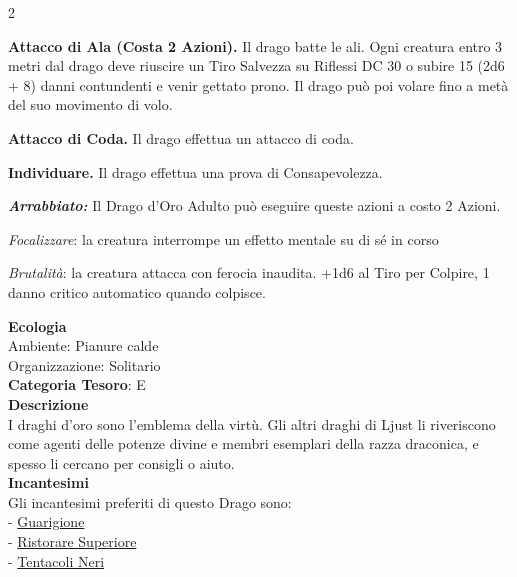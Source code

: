 \begin{multicols}{2}
{\textbf{Attacco di Ala (Costa 2 Azioni).} Il drago batte le ali. Ogni creatura entro 3 metri dal drago deve riuscire un Tiro Salvezza su Riflessi DC 30 o subire 15 (2d6 + 8) danni contundenti e venir gettato prono. Il drago può poi volare fino a metà del suo movimento di volo.

\textbf{Attacco di Coda.} Il drago effettua un attacco di coda.

\textbf{Individuare.} Il drago effettua una prova di Consapevolezza.

\emph{\textbf{Arrabbiato:}} Il Drago d'Oro Adulto può eseguire queste azioni a costo 2 Azioni.

\emph{Focalizzare}: la creatura interrompe un effetto mentale su di sé in corso

\emph{Brutalità}: la creatura attacca con ferocia inaudita. +1d6 al Tiro per Colpire, 1 danno critico automatico quando colpisce.

\textbf{Ecologia}\\
Ambiente: Pianure calde\\
Organizzazione: Solitario\\
\textbf{Categoria Tesoro}: E\\
\textbf{Descrizione}\\
I draghi d'oro sono l'emblema della virtù. Gli altri draghi di Ljust li riveriscono come agenti delle potenze divine e membri esemplari della razza draconica, e spesso li cercano per consigli o aiuto.\\
\textbf{Incantesimi}\\
Gli incantesimi preferiti di questo Drago sono:\\
- \hyperlink{Guarigione}{Guarigione}\\
- \hyperlink{Ristorare Superiore}{Ristorare Superiore}\\
- \hyperlink{Tentacoli Neri}{Tentacoli Neri}

}
\end{multicols}
